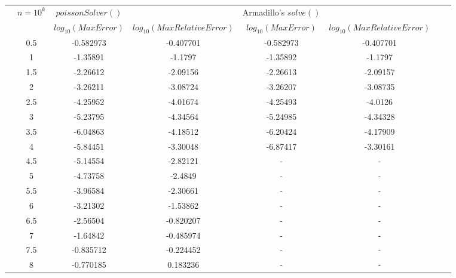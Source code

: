 \documentclass[10pt, conference, compsocconf]{IEEEtran}
\begin{document}
\begin{tabular}{l*{6}{c}r}
              & $n=10^{k}$ & $poissonSolver()$ & & Armadillo's $solve()$ & & \\
&  & $log_{10}\left(Max Error\right)$ & $log_{10}\left(Max Relative Error\right)$   & $log_{10}\left(Max Error\right)$ & $log_{10}\left(Max Relative Error\right)$  & \\

\hline
& 0.5 & -0.582973 & -0.407701      & -0.582973 & -0.407701 & \\
& 1   & -1.35891 & -1.1797     & -1.35892 & -1.1797 & \\
& 1.5 & -2.26612 & -2.09156     & -2.26613 & -2.09157 & \\
& 2   & -3.26211 & -3.08724     & -3.26207 & -3.08735 & \\
& 2.5 & -4.25952 & -4.01674     & -4.25493 & -4.0126 &  \\
& 3   & -5.23795 & -4.34564     & -5.24985 &-4.34328 &  \\
& 3.5 & -6.04863 & -4.18512     & -6.20424 & -4.17909 & \\
& 4   & -5.84451 & -3.30048     & -6.87417 &-3.30161 &  \\
& 4.5 & -5.14554 & -2.82121     & - & - & \\
& 5   & -4.73758 & -2.4849  & - & - & \\
& 5.5 & -3.96584 & -2.30661 & - & - & \\
& 6   & -3.21302 & -1.53862  & - & - & \\
& 6.5 & -2.56504 & -0.820207  & - & - & \\
& 7   & -1.64842 & -0.485974   & - & - & \\
& 7.5 & -0.835712 & -0.224452  & - & - & \\
& 8   & -0.770185 & 0.183236 & - & - & \\
\end{tabular}
\end{document}
